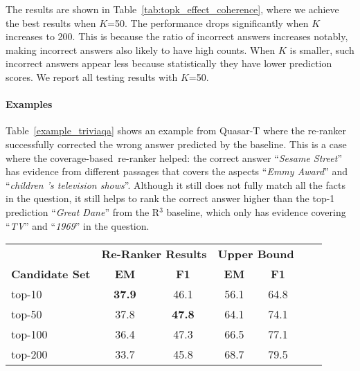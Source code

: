 \documentclass{article} \usepackage{iclr2018_conference,times}
\def \coherence {strength-based}
\def \union {coverage-based}
\begin{document}
The results are shown in Table~\ref{tab:topk_effect_coherence}, where we achieve the best results when $K$=50. The performance drops significantly when $K$ increases to 200. This is because the ratio of incorrect answers increases notably, making incorrect answers also likely to have high counts. When $K$ is smaller, such incorrect answers appear less because statistically they have lower prediction scores. We report all testing results with $K$=50.

\paragraph{Examples}
Table~\ref{example_triviaqa} shows an example from Quasar-T where the re-ranker successfully corrected the wrong answer predicted by the baseline. This is a case where the \union\ re-ranker helped: the correct answer ``\emph{Sesame Street}'' has evidence from different passages that covers the aspects ``\emph{Emmy Award}'' and ``\emph{children 's television shows}''. Although it still does not fully match all the facts in the question, it still helps to rank the correct answer higher than the top-1 prediction ``\emph{Great Dane}'' from the R$^3$ baseline, which only has evidence covering ``\emph{TV}'' and ``\emph{1969}'' in the question.


\begin{table*}[t]
\centering
\begin{tabular}{lcccccc}
\toprule
                  & \multicolumn{2}{c}{\bf Re-Ranker Results} & \multicolumn{2}{c}{\bf Upper Bound} \\
    \bf Candidate Set             & \bf EM            & \bf F1            & \bf EM            & \bf F1 \\
\midrule
top-10 & \textbf{37.9} & 46.1 & 56.1 & 64.8  \\
top-50   & 37.8 & \textbf{47.8}  & 64.1 & 74.1  \\
top-100  & 36.4 & 47.3 & 66.5 & 77.1   \\
top-200  & 33.7 & 45.8 & 68.7 &  79.5  \\
\bottomrule
\end{tabular}
\normalsize
\caption{Results of running \coherence\ re-ranker (counting) on different number of top-$K$ answer candidates on Quasar-T (dev set).}
\label{tab:topk_effect_coherence}
\end{table*}
\end{document}
